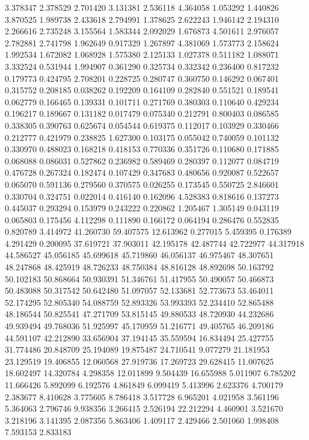 3.378347
2.378529
2.701420
3.131381
2.536118
4.364058
1.053292
1.440826
3.870525
1.989738
2.433618
2.794991
1.378625
2.622243
1.946142
2.194310
2.266616
2.735248
3.155564
1.583344
2.092029
1.676873
4.501611
2.976057
2.782881
2.741798
1.962649
0.917329
1.267897
4.381069
1.573773
2.158624
1.992534
1.672082
1.068928
1.575380
2.125133
1.027378
0.511182
1.088071
3.332524
0.531944
1.994907
0.361290
0.325734
0.332342
0.236400
0.817232
0.179773
0.424795
2.708201
0.228725
0.280747
0.360750
0.146292
0.067401
0.315752
0.208185
0.038262
0.192209
0.164109
0.282840
0.551521
0.189541
0.062779
0.166465
0.139331
0.101711
0.271769
0.380303
0.110640
0.429234
0.196217
0.189667
0.131182
0.017479
0.075340
0.212791
0.800403
0.086585
0.338305
0.390763
0.625674
0.054544
0.619375
0.112017
0.103929
0.330466
0.212777
0.421979
0.238825
1.627300
0.103175
0.055042
0.740059
0.101132
0.330970
0.488023
0.168218
0.418153
0.770336
0.351726
0.110680
0.171885
0.068088
0.086031
0.527862
0.236982
0.589469
0.280397
0.112077
0.084719
0.476728
0.267324
0.182474
0.107429
0.347683
0.480656
0.920087
0.522657
0.065070
0.591136
0.279560
0.370575
0.026255
0.173545
0.550725
2.846601
0.330704
0.324751
0.022014
0.416140
0.162096
4.528383
0.818616
0.137273
0.445037
0.293294
0.153979
0.243222
0.220862
1.205467
1.305149
0.043119
0.065803
0.175456
4.112298
0.111890
0.166172
0.064194
0.286476
0.552835
0.820789
3.414972
41.260730
59.407575
12.613962
0.277015
5.459395
0.176389
4.291429
0.200095
37.619721
37.903011
42.195178
42.487744
42.722977
44.317918
44.586527
45.056185
45.699618
45.719860
46.056137
46.975467
48.307651
48.247868
48.425919
48.726233
48.750384
48.816128
48.892698
50.163792
50.102183
50.868664
50.930391
51.346761
51.417955
50.490057
50.466873
50.483088
50.317542
50.642480
51.097057
52.133681
52.773673
53.464011
52.174295
52.805340
54.088759
52.893326
53.993393
52.234410
52.865488
48.186544
50.825541
47.271709
53.815145
49.880533
48.720930
44.232686
49.939494
49.768036
51.925997
45.170959
51.216771
49.405765
46.209186
44.591107
42.212890
33.656904
37.194145
35.559594
16.834494
25.427755
31.774486
20.848709
25.194089
19.875487
24.710541
9.077279
21.181953
23.129519
19.406855
12.060568
27.919736
17.269723
29.628415
11.007625
18.602497
14.320784
4.298358
12.011899
9.504439
16.655988
5.011907
6.785202
11.666426
5.892099
6.192576
4.861849
6.099419
5.413996
2.623376
4.700179
2.383677
8.410628
3.775605
8.786418
3.517728
6.965201
4.021958
3.561196
5.364063
2.796746
9.938356
3.266415
2.526194
22.212294
4.460901
3.521670
3.218196
3.141395
2.087356
5.863406
1.409117
2.429466
2.501060
1.998408
7.593153
2.833183
